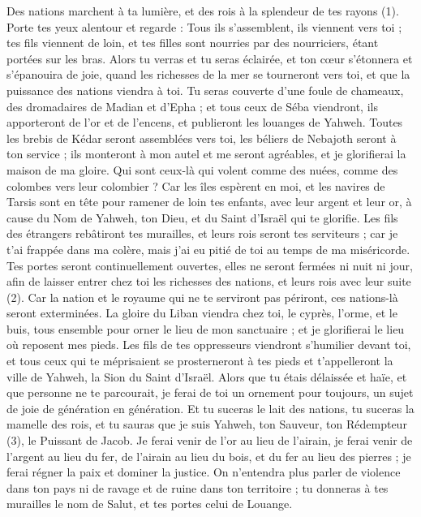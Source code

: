 \begin{multicols}{2}
{Des nations marchent à ta lumière, et des rois à la splendeur de tes rayons (1).
Porte tes yeux alentour et regarde : Tous ils s’assemblent, ils viennent vers toi ; tes fils viennent de loin, et tes filles sont nourries par des nourriciers, étant portées sur les bras.
Alors tu verras et tu seras éclairée, et ton cœur s'étonnera et s'épanouira de joie, quand les richesses de la mer se tourneront vers toi, et que la puissance des nations viendra à toi.
Tu seras couverte d’une foule de chameaux, des dromadaires de Madian et d'Epha ; et tous ceux de Séba viendront, ils apporteront de l'or et de l'encens, et publieront les louanges de Yahweh.
Toutes les brebis de Kédar seront assemblées vers toi, les béliers de Nebajoth seront à ton service ; ils monteront à mon autel et me seront agréables, et je glorifierai la maison de ma gloire.
Qui sont ceux-là qui volent comme des nuées, comme des colombes vers leur colombier ?
Car les îles espèrent en moi, et les navires de Tarsis sont en tête pour ramener de loin tes enfants, avec leur argent et leur or, à cause du Nom de Yahweh, ton Dieu, et du Saint d'Israël qui te glorifie.
Les fils des étrangers rebâtiront tes murailles, et leurs rois seront tes serviteurs ; car je t'ai frappée dans ma colère, mais j'ai eu pitié de toi au temps de ma miséricorde.
Tes portes seront continuellement ouvertes, elles ne seront fermées ni nuit ni jour, afin de laisser entrer chez toi les richesses des nations, et leurs rois avec leur suite (2).
Car la nation et le royaume qui ne te serviront pas périront, ces nations-là seront exterminées.
La gloire du Liban viendra chez toi, le cyprès, l'orme, et le buis, tous ensemble pour orner le lieu de mon sanctuaire ; et je glorifierai le lieu où reposent mes pieds.
Les fils de tes oppresseurs viendront s’humilier devant toi, et tous ceux qui te méprisaient se prosterneront à tes pieds et t'appelleront la ville de Yahweh, la Sion du Saint d'Israël.
Alors que tu étais délaissée et haïe, et que personne ne te parcourait, je ferai de toi un ornement pour toujours, un sujet de joie de génération en génération.
Et tu suceras le lait des nations, tu suceras la mamelle des rois, et tu sauras que je suis Yahweh, ton Sauveur, ton Rédempteur (3), le Puissant de Jacob.
Je ferai venir de l'or au lieu de l'airain, je ferai venir de l'argent au lieu du fer, de l'airain au lieu du bois, et du fer au lieu des pierres ; je ferai régner la paix et dominer la justice.
On n'entendra plus parler de violence dans ton pays ni de ravage et de ruine dans ton territoire ; tu donneras à tes murailles le nom de Salut, et tes portes celui de Louange.
}
\end{multicols}
